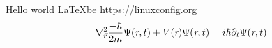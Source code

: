 \documentclass[a4paper,11pt]{article}
\begin{document}
Hello world \LaTeX be \url{https://linuxconfig.org}
\begin{equation}
  \nabla^2_{\vec{r}} \frac{-\hbar}{2m} \Psi(\emph{r}, t) + V(\emph{r})\Psi(\emph{r}, t) = i\hbar \partial_t \Psi(\emph{r}, t)
\end{equation}
\end{document}
